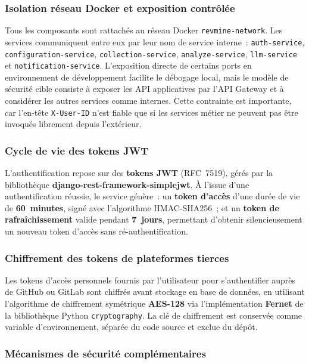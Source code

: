 \subsubsection{Isolation réseau Docker et exposition contrôlée}

Tous les composants sont rattachés au réseau Docker \texttt{revmine-network}. Les services
communiquent entre eux par leur nom de service interne~: \texttt{auth-service},
\texttt{configuration-service}, \texttt{collection-service}, \texttt{analyze-service},
\texttt{llm-service} et \texttt{notification-service}. L'exposition directe de certains ports
en environnement de développement facilite le débogage local, mais le modèle de sécurité cible
consiste à exposer les API applicatives par l'API Gateway et à considérer les autres services
comme internes. Cette contrainte est importante, car l'en-tête \texttt{X-User-ID} n'est fiable
que si les services métier ne peuvent pas être invoqués librement depuis l'extérieur.

\subsubsection{Cycle de vie des tokens JWT}

L'authentification repose sur des \textbf{tokens JWT} (RFC~7519), gérés par la bibliothèque
\textbf{django-rest-framework-simplejwt}. À l'issue d'une authentification réussie, le service
génère~: un \textbf{token d'accès} d'une durée de vie de \textbf{60~minutes}, signé avec
l'algorithme HMAC-SHA256~; et un \textbf{token de rafraîchissement} valide pendant
\textbf{7~jours}, permettant d'obtenir silencieusement un nouveau token d'accès sans
ré-authentification.

\subsubsection{Chiffrement des tokens de plateformes tierces}

Les tokens d'accès personnels fournis par l'utilisateur pour s'authentifier auprès de GitHub ou
GitLab sont chiffrés avant stockage en base de données, en utilisant l'algorithme de chiffrement
symétrique \textbf{AES-128} via l'implémentation \textbf{Fernet} de la bibliothèque Python
\texttt{cryptography}. La clé de chiffrement est conservée comme variable d'environnement,
séparée du code source et exclue du dépôt.

\subsubsection{Mécanismes de sécurité complémentaires}

